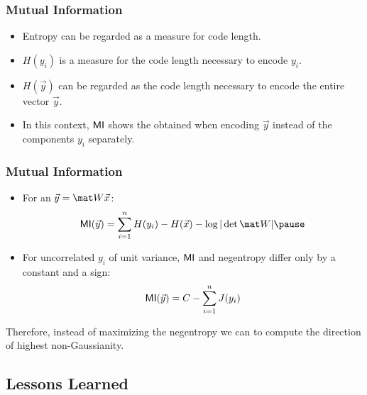 \begin{frame}
  \frametitle{Mutual Information \cont}
  

  \begin{itemize}
    \item Entropy can be regarded as a measure for code length. \pause
    \item $H(y_i)$ is a measure for the code length necessary to encode $y_i$. \pause
    \item $H(\vec y)$ can be regarded as the code length necessary to encode the entire vector $\vec y$. \\[.5cm] \pause
    \item In this context, $\mathop{\mathsf{MI}}$ shows the  obtained when encoding $\vec y$ instead of the components $y_i$ separately.
  \end{itemize}
\end{frame}


\begin{frame}
  \frametitle{Mutual Information \cont}


  \begin{itemize}
    \item For an  $\vec y = \mat W \vec x$:
      \begin{displaymath}
        \MI(\vec y) = \sum_{i=1}^n H(y_i) - H(\vec x) - \log | \det \mat W | \pause
      \end{displaymath}
    \item For uncorrelated $y_i$ of unit variance, $\mathop{\mathsf{MI}}$ and negentropy differ only by a constant and a sign:
      \begin{displaymath}
        \mathop{\mathsf{MI}}(\vec y) = C - \sum_{i=1}^n J(y_i)
      \end{displaymath}
  \end{itemize}
  \pspread

  Therefore, instead of maximizing the negentropy we can  to compute the direction of highest non-Gaussianity.
\end{frame}


\subsection{Lessons Learned}

